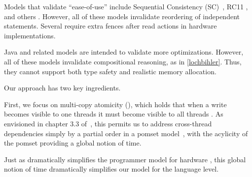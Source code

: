 Models that validate ``ease-of-use'' include Sequential Consistency (SC)~\citep{Lamport:1979:MMC:1311099.1311750}, RC11 \citep{DBLP:conf/pldi/LahavVKHD17}, and others \citep{Dolan:2018:BDR:3192366.3192421,DBLP:conf/pldi/LahavVKHD17,DBLP:conf/lics/JeffreyR16,BoehmOOTA}.  However, all of these models invalidate reordering of independent statements.  Several require extra fences after read actions in hardware implementations. %


Java and  related models \citep{Manson:2005:JMM:1047659.1040336,DBLP:conf/esop/JagadeesanPR10,DBLP:conf/popl/KangHLVD17,DBLP:journals/pacmpl/ChakrabortyV19} are intended to validate more optimizations.  However, all of these models invalidate compositional reasoning, as in \eqref{lochbihler}.  Thus, they cannot support both type safety and realistic memory allocation.


Our approach has two key ingredients.  

First, we focus on multi-copy atomicity (\mca), which holds that when a write becomes visible to one threads it must become visible to all threads  \citep{DBLP:journals/pacmpl/PulteFDFSS18}.  As envisioned in chapter 3.3 of~\citet{AlglaveThesis},  this permits us to address cross-thread dependencies simply by a partial order in a pomset model~\citep{GISCHER1988199,Plotkin:1997:TSP:266557.266600}, with the acylicity of the pomset providing a global notion of time.  

Just as \mca{} dramatically simplifies the programmer model for hardware \citep{DBLP:journals/pacmpl/PulteFDFSS18},
this global notion of time dramatically simplifies our model for the language level.

